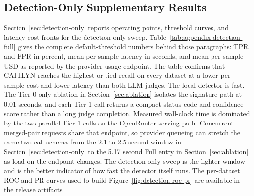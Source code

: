 \subsection{Detection-Only Supplementary Results}
\label{app:detection-supplement}



Section~\ref{sec:detection-only} reports operating points, threshold
curves, and latency-cost fronts for the detection-only sweep.
Table~\ref{tab:appendix-detection-full} gives the complete default-threshold
numbers behind those paragraphs: TPR and FPR in percent, mean per-sample
latency in seconds, and mean per-sample USD as reported by the provider
usage endpoint.
The table confirms that CAITLYN reaches the highest or tied
recall on every dataset at a lower per-sample cost and lower latency than
both LLM judges.
The local detector is fast. The Tier-0-only ablation in
Section~\ref{sec:ablation} isolates the signature path at 0.01
seconds, and each Tier-1 call returns a compact status code and
confidence score rather than a long judge completion. Measured
wall-clock time is dominated by the two parallel Tier-1 calls on the
OpenRouter serving path. Concurrent merged-pair requests share that
endpoint, so provider queueing can stretch the same two-call schema
from the 2.1 to 2.5 second window in
Section~\ref{sec:detection-only} to the 5.17 second Full entry in
Section~\ref{sec:ablation} as load on the endpoint changes. The
detection-only sweep is the lighter window and is the better
indicator of how fast the detector itself runs.
The per-dataset ROC and PR curves used to build
Figure~\ref{fig:detection-roc-pr} are available in the release artifacts.
